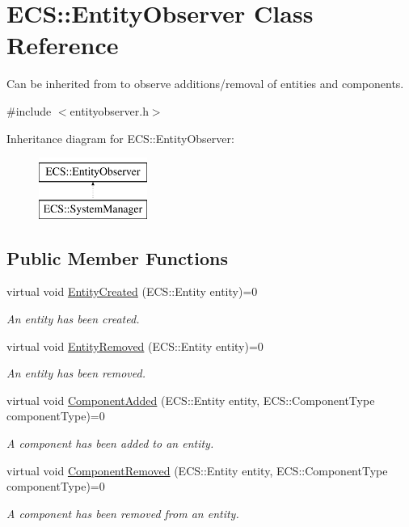 \hypertarget{class_e_c_s_1_1_entity_observer}{\section{E\-C\-S\-:\-:Entity\-Observer Class Reference}
\label{class_e_c_s_1_1_entity_observer}
}


Can be inherited from to observe additions/removal of entities and components.  




{\ttfamily \#include $<$entityobserver.\-h$>$}

Inheritance diagram for E\-C\-S\-:\-:Entity\-Observer\-:\begin{figure}[H]
\begin{center}
\leavevmode
\includegraphics[height=2.000000cm]{class_e_c_s_1_1_entity_observer}
\end{center}
\end{figure}
\subsection*{Public Member Functions}
\begin{DoxyCompactItemize}
\item 
virtual void \hyperlink{class_e_c_s_1_1_entity_observer_aa7add9fe7a0b975714428dbb937e498e}{Entity\-Created} (E\-C\-S\-::\-Entity entity)=0
\begin{DoxyCompactList}\small\item\em An entity has been created. \end{DoxyCompactList}\item 
virtual void \hyperlink{class_e_c_s_1_1_entity_observer_afa1d1d09e5cbb0070c8ec341f1a107e9}{Entity\-Removed} (E\-C\-S\-::\-Entity entity)=0
\begin{DoxyCompactList}\small\item\em An entity has been removed. \end{DoxyCompactList}\item 
virtual void \hyperlink{class_e_c_s_1_1_entity_observer_a53776b757b98ac78d504f0cfae0cfa41}{Component\-Added} (E\-C\-S\-::\-Entity entity, E\-C\-S\-::\-Component\-Type component\-Type)=0
\begin{DoxyCompactList}\small\item\em A component has been added to an entity. \end{DoxyCompactList}\item 
virtual void \hyperlink{class_e_c_s_1_1_entity_observer_a67dfa10ef698b6de537073fb0b0dd83b}{Component\-Removed} (E\-C\-S\-::\-Entity entity, E\-C\-S\-::\-Component\-Type component\-Type)=0
\begin{DoxyCompactList}\small\item\em A component has been removed from an entity. \end{DoxyCompactList}\end{DoxyCompactItemize}


